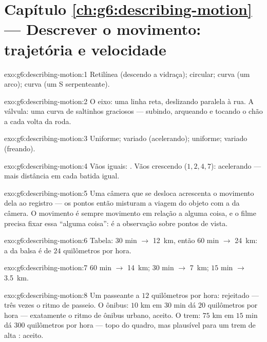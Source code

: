 \section*{Capítulo \ref{ch:g6:describing-motion} --- Descrever o movimento: trajetória e velocidade}

\begin{solution}{exo:g6:describing-motion:1}
Retilínea (descendo a vidraça); circular; curva (um arco); curva (um
S serpenteante).
\end{solution}

\begin{solution}{exo:g6:describing-motion:2}
O eixo: uma linha reta, deslizando paralela à rua. A válvula: uma
curva de saltinhos graciosos --- subindo, arqueando e tocando o chão
a cada volta da roda.
\end{solution}

\begin{solution}{exo:g6:describing-motion:3}
Uniforme; variado (acelerando); uniforme; variado (freando).
\end{solution}

\begin{solution}{exo:g6:describing-motion:4}
Vãos iguais: . Vãos crescendo ($1, 2, 4, 7$):
acelerando --- mais distância em cada batida igual.
\end{solution}

\begin{solution}{exo:g6:describing-motion:5}
Uma câmera que se desloca acrescenta o movimento dela ao registro ---
os pontos então misturam a viagem do objeto com a da câmera. O
movimento é sempre movimento em relação a alguma coisa, e o filme
precisa fixar essa ``alguma coisa'': é a observação sobre pontos de
vista.
\end{solution}

\begin{solution}{exo:g6:describing-motion:6}
Tabela: $30$ min $\to$ \qty{12}{km}, então $60$ min $\to$
\qty{24}{km}: a  da balsa é de $24$ quilômetros por hora.
\end{solution}

\begin{solution}{exo:g6:describing-motion:7}
$60$ min $\to$ \qty{14}{km}; $30$ min $\to$ \qty{7}{km}; $15$ min
$\to$ \qty{3.5}{km}.
\end{solution}

\begin{solution}{exo:g6:describing-motion:8}
Um passeante a $12$ quilômetros por hora: rejeitado --- três vezes o
ritmo de passeio. O ônibus: $10$ km em $30$ min dá $20$ quilômetros
por hora --- exatamente o ritmo de ônibus urbano, aceito. O trem:
$75$ km em $15$ min dá $300$ quilômetros por hora --- topo do quadro,
mas plausível para um trem de alta : aceito.
\end{solution}

